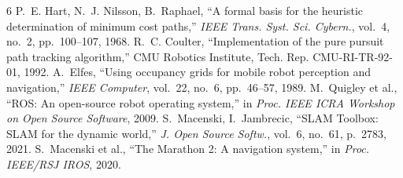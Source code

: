 \documentclass[10pt,twocolumn]{article}
\begin{document}
{\small

\begin{thebibliography}{6}
 P.~E. Hart, N.~J. Nilsson, B.~Raphael, ``A formal basis for the heuristic determination of minimum cost paths,'' \emph{IEEE Trans. Syst. Sci. Cybern.}, vol.~4, no.~2, pp.~100--107, 1968.
 R.~C. Coulter, ``Implementation of the pure pursuit path tracking algorithm,'' CMU Robotics Institute, Tech. Rep. CMU-RI-TR-92-01, 1992.
 A.~Elfes, ``Using occupancy grids for mobile robot perception and navigation,'' \emph{IEEE Computer}, vol.~22, no.~6, pp.~46--57, 1989.
 M.~Quigley et al., ``ROS: An open-source robot operating system,'' in \emph{Proc. IEEE ICRA Workshop on Open Source Software}, 2009.
 S.~Macenski, I.~Jambrecic, ``SLAM Toolbox: SLAM for the dynamic world,'' \emph{J. Open Source Softw.}, vol.~6, no.~61, p.~2783, 2021.
 S.~Macenski et al., ``The Marathon 2: A navigation system,'' in \emph{Proc. IEEE/RSJ IROS}, 2020.
\end{thebibliography}
}
\end{document}
